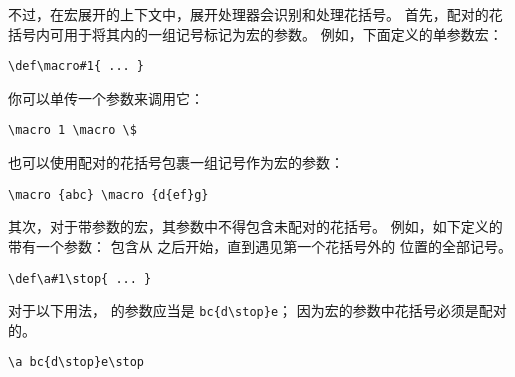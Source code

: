 \documentclass{book}
\begin{document}
不过，在宏展开的上下文中，展开处理器会识别和处理花括号。
首先，配对的花括号内可用于将其内的一组记号标记为宏的参数。
例如，下面定义的单参数宏：
\begin{verbatim}
\def\macro#1{ ... }
\end{verbatim}
你可以单传一个参数来调用它：
\begin{verbatim}
\macro 1 \macro \$
\end{verbatim}
也可以使用配对的花括号包裹一组记号作为宏的参数：
\begin{verbatim}
\macro {abc} \macro {d{ef}g}
\end{verbatim}

其次，对于带参数的宏，其参数中不得包含未配对的花括号。
例如，如下定义的  带有一个参数：
包含从  之后开始，直到遇见第一个花括号外的  位置的全部记号。
\begin{verbatim}
\def\a#1\stop{ ... }
\end{verbatim}
对于以下用法， 的参数应当是 \verb>bc{d\stop}e>；
因为宏的参数中花括号必须是配对的。
\begin{verbatim}
\a bc{d\stop}e\stop
\end{verbatim}

\end{document}

